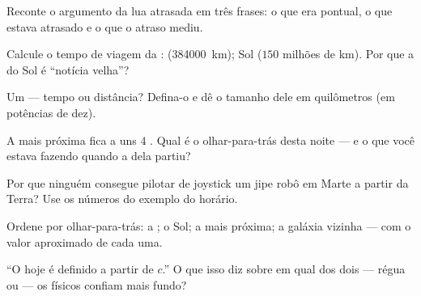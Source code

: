 \begin{exercise}[$\star$]\label{exo:g8:speed-of-light:2}
Reconte o argumento da lua atrasada em três frases: o que era
pontual, o que estava atrasado e o que o atraso mediu.
\end{exercise}

\begin{exercise}[$\star$]\label{exo:g8:speed-of-light:3}
Calcule o tempo de viagem da :  (\qty{384000}{km}); Sol ($150$
milhões de km). Por que a  do Sol é ``notícia velha''?
\end{exercise}

\begin{exercise}[$\star$]\label{exo:g8:speed-of-light:4}
Um  --- tempo ou distância? Defina-o e dê o tamanho dele em
quilômetros (em potências de dez).
\end{exercise}

\begin{exercise}[$\star$]\label{exo:g8:speed-of-light:5}
A  mais próxima fica a uns $4$ . Qual é o
olhar-para-trás desta noite --- e o que você estava fazendo quando a
 dela partiu?
\end{exercise}

\begin{exercise}[$\star$]\label{exo:g8:speed-of-light:6}
Por que ninguém consegue pilotar de joystick um jipe robô em Marte a
partir da Terra? Use os números do exemplo do horário.
\end{exercise}

\begin{exercise}[$\star$]\label{exo:g8:speed-of-light:7}
Ordene por olhar-para-trás: a ; o Sol; a  mais próxima; a
galáxia vizinha --- com o valor aproximado de cada uma.
\end{exercise}

\begin{exercise}[$\star$]\label{exo:g8:speed-of-light:8}
``O  hoje é definido a partir de $c$.'' O que isso diz sobre em
qual dos dois --- régua ou  --- os físicos confiam mais fundo?
\end{exercise}


